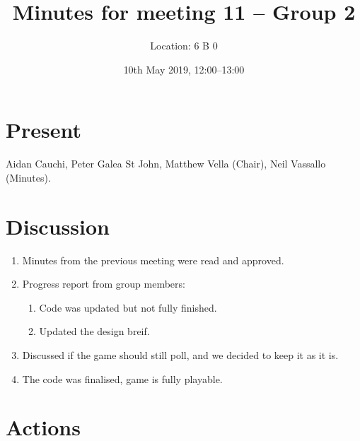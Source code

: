 \documentclass[11pt,a4paper]{article}
\title{ Minutes for meeting 11 -- Group 2}
\author{Location: 6 B 0}
\date{10th May 2019, 12:00--13:00}
\begin{document}
\maketitle

\section*{Present}
Aidan Cauchi,
Peter Galea St John,
Matthew Vella (Chair),
Neil Vassallo (Minutes).



\section*{Discussion}

\begin{enumerate}


\item Minutes from the previous meeting were read and approved.

\item Progress report from group members:
   \begin{enumerate}
   \item Code was updated but not fully finished.
   \item Updated the design breif.
   \end{enumerate}

\item Discussed if the game should still poll, and we decided to keep it as it is. 

\item The code was finalised, game is fully playable. 


\end{enumerate}


\section*{Actions}
\end{document}
